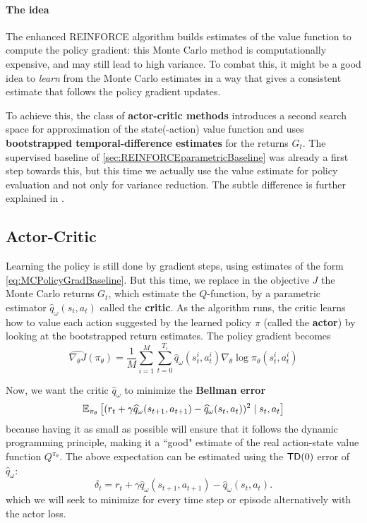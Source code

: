 \documentclass[../course-notes.tex]{subfiles}
\begin{document}
\paragraph{The idea} The enhanced REINFORCE algorithm builds estimates of the value function to compute the policy gradient: this Monte Carlo method is computationally expensive, and may still lead to high variance. To combat this, it might be a good idea to \textit{learn} from the Monte Carlo estimates in a way that gives a consistent estimate that follows the policy gradient updates.

To achieve this, the class of \textbf{\bluefont actor-critic methods} introduces a second search space for approximation of the state(-action) value function and uses \textbf{bootstrapped temporal-difference estimates} for the returns $G_t$. The supervised baseline of \cref{sec:REINFORCEparametricBaseline} was already a first step towards this, but this time we actually use the value estimate for policy evaluation and not only for variance reduction. The subtle difference is further explained in \cite[chap.\ 13.5]{Sutton1998}.

\subsection{Actor-Critic}


Learning the policy is still done by gradient steps, using estimates of the form \cref{eq:MCPolicyGradBaseline}. But this time, we replace in the objective $J$ the Monte Carlo returns $G_t$, which estimate the $Q$-function, by a parametric estimator $\widehat{q}_\omega(s_t, a_t)$ called the \textbf{\bluefont critic}. As the algorithm runs, the critic learns how to value each action suggested by the learned policy $\pi$ (called the \textbf{\bluefont actor}) by looking at the bootstrapped return estimates. The policy gradient becomes
\begin{equation}\label{eq:ActorPolicyGrad}
\widehat{\nabla_\theta J}(\pi_\theta) =
\frac{1}{M}\sum_{i=1}^M
\sum_{t=0}^{T_i} \widehat{q}_\omega(s^i_t,a^i_t)
\nabla_\theta \log\pi_\theta(s^i_t, a^i_t)
\end{equation}

Now, we want the critic $\widehat{q}_\omega$ to minimize the \textbf{Bellman error}
\[
\operatorname{\mathbb{E}}_{\pi_\theta}\left[
(r_t + \gamma\widehat{q}_\omega(s_{t+1}, a_{t+1}) - \widehat{q}_\omega(s_t,a_t))^2
\mid s_t, a_t
\right]
\]
because having it as small as possible will ensure that it follows the dynamic programming principle, making it a ``good" estimate of the real action-state value function $Q^{\pi_\theta}$. The above expectation can be estimated using the $\mathsf{TD}(0)$ error of $\widehat{q}_\omega$:
\[
\delta_t = r_t + \gamma\widehat{q}_\omega(s_{t+1}, a_{t+1}) - \widehat{q}_\omega(s_t,a_t).
\]
which we will seek to minimize for every time step or episode alternatively with the actor loss.
\end{document}
